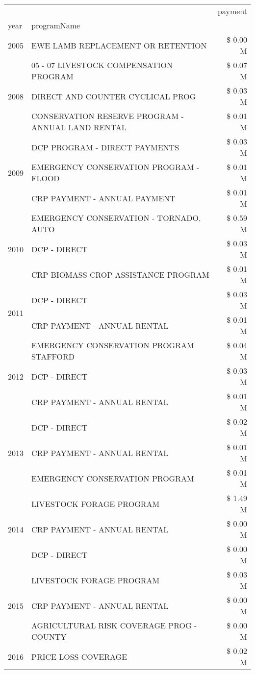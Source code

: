 \begin{tabular}{llr}
\toprule
 &  & payment \\
year & programName &  \\
\midrule
2005 & EWE LAMB REPLACEMENT OR RETENTION & \$ 0.00 M \\
\cline{1-3}
\multirow[t]{3}{*}{2008} & 05 - 07 LIVESTOCK COMPENSATION PROGRAM & \$ 0.07 M \\
 & DIRECT AND COUNTER CYCLICAL PROG & \$ 0.03 M \\
 & CONSERVATION RESERVE PROGRAM - ANNUAL LAND RENTAL & \$ 0.01 M \\
\cline{1-3}
\multirow[t]{3}{*}{2009} & DCP PROGRAM - DIRECT PAYMENTS & \$ 0.03 M \\
 & EMERGENCY CONSERVATION PROGRAM - FLOOD & \$ 0.01 M \\
 & CRP PAYMENT - ANNUAL PAYMENT & \$ 0.01 M \\
\cline{1-3}
\multirow[t]{3}{*}{2010} & EMERGENCY CONSERVATION - TORNADO, AUTO & \$ 0.59 M \\
 & DCP - DIRECT & \$ 0.03 M \\
 & CRP BIOMASS CROP ASSISTANCE PROGRAM & \$ 0.01 M \\
\cline{1-3}
\multirow[t]{2}{*}{2011} & DCP - DIRECT & \$ 0.03 M \\
 & CRP PAYMENT - ANNUAL RENTAL & \$ 0.01 M \\
\cline{1-3}
\multirow[t]{3}{*}{2012} & EMERGENCY CONSERVATION PROGRAM STAFFORD & \$ 0.04 M \\
 & DCP - DIRECT & \$ 0.03 M \\
 & CRP PAYMENT - ANNUAL RENTAL & \$ 0.01 M \\
\cline{1-3}
\multirow[t]{3}{*}{2013} & DCP - DIRECT & \$ 0.02 M \\
 & CRP PAYMENT - ANNUAL RENTAL & \$ 0.01 M \\
 & EMERGENCY CONSERVATION PROGRAM & \$ 0.01 M \\
\cline{1-3}
\multirow[t]{3}{*}{2014} & LIVESTOCK FORAGE PROGRAM & \$ 1.49 M \\
 & CRP PAYMENT - ANNUAL RENTAL & \$ 0.00 M \\
 & DCP - DIRECT & \$ 0.00 M \\
\cline{1-3}
\multirow[t]{3}{*}{2015} & LIVESTOCK FORAGE PROGRAM & \$ 0.03 M \\
 & CRP PAYMENT - ANNUAL RENTAL & \$ 0.00 M \\
 & AGRICULTURAL RISK COVERAGE PROG - COUNTY & \$ 0.00 M \\
\cline{1-3}
\multirow[t]{3}{*}{2016} & PRICE LOSS COVERAGE & \$ 0.02 M \\

\end{tabular}
